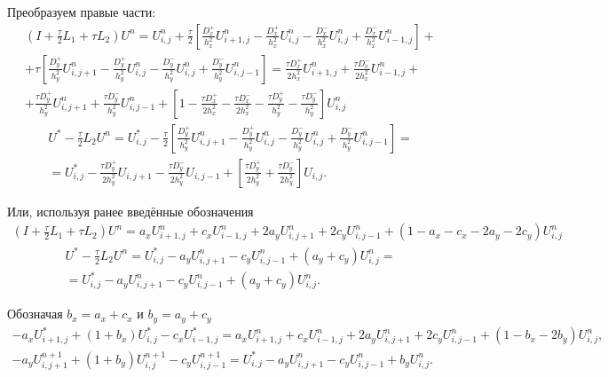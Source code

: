 \documentclass[a4paper,12pt]{article}
\begin{document}
Преобразуем правые части:
\begin{multline*}
  \left( I + \frac{\tau}{2} L_1 + \tau L_2 \right) U^n = U^n_{i,j} + \frac{\tau}{2} \left[  \frac{D^+_x}{h_x^2} U^n_{i+1,j} - \frac{D^+_x}{h_x^2}U^n_{i,j} - \frac{D^-_x}{h_x^2} U^n_{i,j} + \frac{D^-_x}{h_x^2}U^n_{i-1,j} \right] + \\  + \tau \left[ \frac{D^+_y}{h_y^2} U^n_{i,j+1} - \frac{D^+_y}{h_y^2}U^n_{i,j} - \frac{D^-_y}{h_y^2} U^n_{i,j} + \frac{D^-_y}{h_y^2}U^n_{i,j-1} \right] = \frac{\tau D^+_x}{2 h_x^2} U^n_{i+1,j} + \frac{\tau D^-_x}{2 h_x^2} U^n_{i-1,j} + \\ + \frac{\tau D^+_y}{h_y^2} U^n_{i,j+1} + \frac{\tau D^-_y}{h_y^2} U^n_{i,j-1} + \left[ 1 -  \frac{\tau D^+_x}{2h_x^2} - \frac{\tau D^-_x}{2h_x^2} - \frac{ \tau D^+_y}{h_y^2} - \frac{\tau D^-_y}{h_y^2} \right] U^n_{i,j}
\end{multline*}
\begin{multline*}
  U^* - \frac{\tau}{2} L_2 U^n = U_{i,j}^* - \frac{\tau}{2} \left[\frac{D^+_y}{h_y^2} U^{n}_{i,j+1} - \frac{D^+_y}{h_y^2}U^{n}_{i,j} - \frac{D^-_y}{h_y^2} U^{n}_{i,j} + \frac{D^-_y}{h_y^2}U^{n}_{i,j-1} \right] = \\
  = U_{i,j}^* - \frac{\tau D^+_y}{2 h_y^2} U_{i,j+1} - \frac{\tau D^-_y}{2 h_y^2} U_{i,j-1} + \left[ \frac{\tau D^+_y}{2 h_y^2} + \frac{\tau D^-_y}{2 h_y^2} \right] U_{i,j}.
\end{multline*}

Или, используя ранее введённые обозначения
\begin{multline*}
  \left( I + \frac{\tau}{2} L_1 + \tau L_2 \right) U^n =
  a_x U^n_{i+1,j} + c_x U^n_{i-1,j} + 2  a_y U^n_{i,j+1} + 2 c_y U^n_{i,j-1} +
  (1 -  a_x - c_x - 2 a_y - 2 c_y ) U^n_{i,j}
\end{multline*}
\begin{multline*}
  U^* - \frac{\tau}{2} L_2 U^n = U_{i,j}^* - a_y U^n_{i,j+1} - c_y U^n_{i,j-1} +
  \left( a_y + c_y \right) U^n_{i,j} = \\
  = U_{i,j}^* - a_y U^n_{i,j+1} - c_y U^n_{i,j-1} + (a_y + c_y) U^n_{i,j}.
\end{multline*}


Обозначая $b_x = a_x + c_x$ и $b_y = a_y + c_y$
\begin{align}
  \label{eq:2d-scheme}
  - a_x U^*_{i+1,j} + \left(1 + b_x \right) U^*_{i,j} - c_x  U^*_{i-1,j} =
  a_x U^n_{i+1,j} + c_x U^n_{i-1,j} + 2  a_y U^n_{i,j+1} + 2 c_y U^n_{i,j-1} +
  (1 -  b_x - 2 b_y) U^n_{i,j},\\
  - a_y U^{n+1}_{i,j+1} + \left(1 + b_y \right)  U^{n+1}_{i,j} - c_y U^{n+1}_{i,j-1} =
  U_{i,j}^* - a_y U^n_{i,j+1} - c_y U^n_{i,j-1} + b_y U^n_{i,j}.
\end{align}
\end{document}
